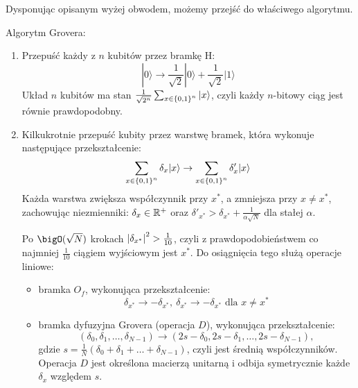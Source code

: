 Dysponując opisanym wyżej obwodem, możemy przejść do właściwego algorytmu.
\begin{greyframe}
    Algorytm Grovera:
    \begin{enumerate}
        \item Przepuść każdy z \( n \) kubitów przez bramkę H:
        \[
            |0\rangle \rightarrow \frac{1}{\sqrt{2}}|0\rangle + \frac{1}{\sqrt{2}}|1\rangle
        \]
        Układ \( n \) kubitów ma stan \( \frac{1}{\sqrt{2^n}} \sum_{x \in \set{0,1}^n} |x\rangle \), czyli każdy \( n \)-bitowy ciąg jest równie prawdopodobny.
        \item Kilkukrotnie przepuść kubity przez warstwę bramek, która wykonuje następujące przekształcenie:
        \[
            \sum_{x \in \set{0,1}^n} \delta_x |x\rangle \rightarrow \sum_{x \in \set{0,1}^n} \delta'_x |x\rangle
        \]
        Każda warstwa zwiększa współczynnik przy \( x^{*} \), a zmniejsza przy \( x \neq x^{*} \), zachowując niezmienniki: \( \delta_x \in \mathbb{R}^{+} \)
        oraz \( \delta'_{x^{*}} > \delta_{x^{*}} + \frac{1}{\alpha\sqrt{N}} \) dla stałej \( \alpha \).

        Po  \( \bigO(\sqrt{N}) \) krokach \( \left\lvert\delta_{x^{*}}\right\rvert^2 > \frac{1}{10} \), czyli z prawdopodobieństwem co najmniej \( \frac{1}{10} \) ciągiem wyjściowym jest \( x^{*} \).
        Do osiągnięcia tego służą operacje liniowe:
        \begin{itemize}
            \item bramka \( O_f \), wykonująca przekształcenie:
            \[
                \delta_{x^{*}} \rightarrow -\delta_{x^{*}}, \ \delta_{x^{*}} \rightarrow -\delta_{x^{*}} \text{ dla } x \neq x^{*}
            \]
            \item bramka dyfuzyjna Grovera (operacja \( D \)), wykonująca przekształcenie:
            \[
                (\delta_0, \delta_1, \ldots, \delta_{N-1}) \rightarrow (2s - \delta_0, 2s - \delta_1, \ldots, 2s - \delta_{N-1}),
            \]
            gdzie \( s = \frac{1}{N}(\delta_0 + \delta_1 + \ldots + \delta_{N-1}) \), czyli jest średnią współczynników.
            Operacja \( D \) jest określona macierzą unitarną i odbija symetrycznie każde \( \delta_x \) względem \( s \).
        \end{itemize}
    \end{enumerate}
\end{greyframe}

